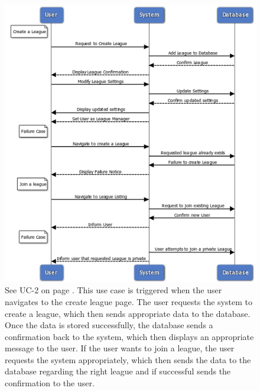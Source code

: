 \begin{figure}[H]
\centering
\includegraphics[width=5.5in]{./img/uc2.png}
\caption{See UC-2 on page \pageref{UC-2}. This use case is triggered when the user navigates
to the create league page.
The user requests the system to create a league, which then sends appropriate
data to the database. Once the data is stored successfully, the database sends a
confirmation back to the system, which then displays an appropriate message to the
user. If the user wants to join a league, the user requests the system appropriately,
which then sends the data to the database regarding the right league and if
successful sends the confirmation to the user.}
\end{figure}

